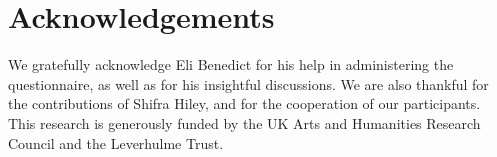 \documentclass[output=paper, hidelinks]{langscibook}
\begin{document}
\section*{Acknowledgements}
We gratefully acknowledge Eli Benedict for his help in administering the questionnaire, as well as for his insightful discussions. We are also thankful for the contributions of Shifra Hiley, and for the cooperation of our participants. This research is generously funded by the UK Arts and Humanities Research Council and the Leverhulme Trust.

\sloppy
\printbibliography[heading=subbibliography,notkeyword=this]
\end{document}
